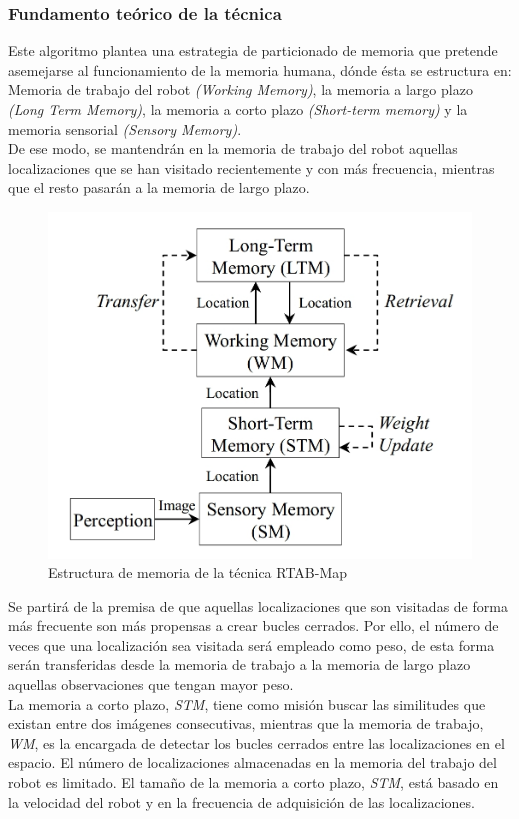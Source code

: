 \subsubsection{Fundamento teórico de la técnica}
Este algoritmo plantea una estrategia de particionado de memoria que pretende asemejarse al funcionamiento de la memoria humana, 
dónde ésta se estructura en: \\
Memoria de trabajo del robot \textit{(Working Memory)}, la memoria a largo plazo \textit{(Long Term Memory)}, 
la memoria a corto plazo \textit{(Short-term memory)} y la memoria sensorial \textit{(Sensory Memory)}. \\
De ese modo, se mantendrán en la memoria de trabajo del robot aquellas localizaciones que se han visitado recientemente 
y con más frecuencia, mientras que el resto pasarán a la memoria de largo plazo. \\

\begin{figure}[h!]
    \centering
    \includegraphics[width=.4\textwidth]{images/rtabmap_memory}
    \caption{Estructura de memoria de la técnica RTAB-Map}
\end{figure}


Se partirá de la premisa de que aquellas localizaciones que son visitadas de forma más frecuente son más propensas a 
crear bucles cerrados. Por ello, el número de veces que una localización sea visitada será empleado como peso, de 
esta forma serán transferidas desde la memoria de trabajo a la memoria de largo plazo aquellas observaciones que 
tengan mayor peso.\\
La memoria a corto plazo, \textit{STM}, tiene como misión buscar las similitudes que existan entre dos imágenes
consecutivas, mientras que la memoria de trabajo, \textit{WM}, es la encargada de detectar los bucles cerrados entre las
localizaciones en el espacio. El número de localizaciones almacenadas en la memoria del trabajo del robot es
limitado. El tamaño de la memoria a corto plazo, \textit{STM}, está basado en la velocidad del robot y en la frecuencia de
adquisición de las localizaciones. \\

